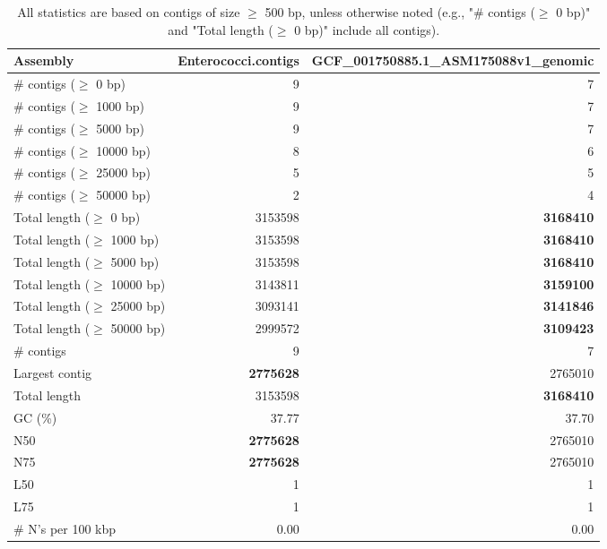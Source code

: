 \documentclass[12pt,a4paper]{article}
\begin{document}
\begin{table}[ht]
\begin{center}
\caption{All statistics are based on contigs of size $\geq$ 500 bp, unless otherwise noted (e.g., "\# contigs ($\geq$ 0 bp)" and "Total length ($\geq$ 0 bp)" include all contigs).}
\begin{tabular}{|l*{2}{|r}|}
\hline
Assembly & Enterococci.contigs & GCF\_001750885.1\_ASM175088v1\_genomic \\ \hline
\# contigs ($\geq$ 0 bp) & 9 & 7 \\ \hline
\# contigs ($\geq$ 1000 bp) & 9 & 7 \\ \hline
\# contigs ($\geq$ 5000 bp) & 9 & 7 \\ \hline
\# contigs ($\geq$ 10000 bp) & 8 & 6 \\ \hline
\# contigs ($\geq$ 25000 bp) & 5 & 5 \\ \hline
\# contigs ($\geq$ 50000 bp) & 2 & 4 \\ \hline
Total length ($\geq$ 0 bp) & 3153598 & {\bf 3168410} \\ \hline
Total length ($\geq$ 1000 bp) & 3153598 & {\bf 3168410} \\ \hline
Total length ($\geq$ 5000 bp) & 3153598 & {\bf 3168410} \\ \hline
Total length ($\geq$ 10000 bp) & 3143811 & {\bf 3159100} \\ \hline
Total length ($\geq$ 25000 bp) & 3093141 & {\bf 3141846} \\ \hline
Total length ($\geq$ 50000 bp) & 2999572 & {\bf 3109423} \\ \hline
\# contigs & 9 & 7 \\ \hline
Largest contig & {\bf 2775628} & 2765010 \\ \hline
Total length & 3153598 & {\bf 3168410} \\ \hline
GC (\%) & 37.77 & 37.70 \\ \hline
N50 & {\bf 2775628} & 2765010 \\ \hline
N75 & {\bf 2775628} & 2765010 \\ \hline
L50 & 1 & 1 \\ \hline
L75 & 1 & 1 \\ \hline
\# N's per 100 kbp & 0.00 & 0.00 \\ \hline
\end{tabular}
\end{center}
\end{table}
\end{document}
